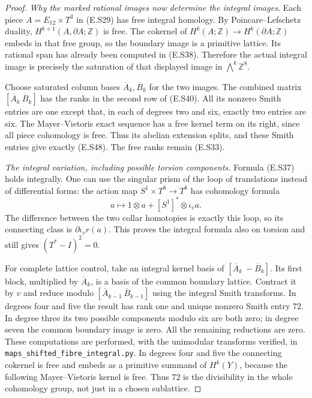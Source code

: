 \begin{proof}
\emph{Why the marked rational images now determine the integral images.}
Each piece $A=E_{12}\times T^3$ in (E.S29) has free
integral homology. By Poincare--Lefschetz duality,
$H^{k+1}(A,\partial A;\mathbb Z)$ is free. The cokernel
of $H^k(A;\mathbb Z)\to H^k(\partial A;\mathbb Z)$
embeds in that free group, so the boundary image is a
primitive lattice. Its rational span has already been
computed in (E.S38). Therefore the actual integral
image is precisely the saturation of that displayed
image in $\bigwedge^k\mathbb Z^8$.

Choose saturated column bases $\overline A_k,\overline B_k$
for the two images. The combined matrix
$[\overline A_k\ \overline B_k]$ has the ranks in the
second row of (E.S40). All its nonzero Smith entries are
one except that, in each of degrees two and six, exactly
two entries are six. The Mayer--Vietoris exact sequence
has a free kernel term on its right, since all piece
cohomology is free. Thus its abelian extension splits,
and these Smith entries give exactly (E.S48). The free
ranks remain (E.S33).

\emph{The integral variation, including possible torsion components.}
Formula (E.S37) holds integrally. One can use the singular
prism of the loop of translations instead of differential
forms: the action map $S^1\times T^8\to T^8$ has
cohomology formula
\[
 a\longmapsto 1\otimes a+[S^1]^*\otimes\iota_v a.
\]
The difference between the two collar homotopies is
exactly this loop, so its connecting class is
$\partial\iota_v r(a)$. This proves the integral formula
also on torsion and still gives $(T^*-I)^2=0$.

For complete lattice control, take an integral kernel
basis of $[\overline A_k\ -\overline B_k]$. Its first
block, multiplied by $\overline A_k$, is a basis of the
common boundary lattice. Contract it by $v$ and reduce
modulo $[\overline A_{k-1}\ \overline B_{k-1}]$ using
the integral Smith transforms. In degrees four and five
the result has rank one and unique nonzero Smith entry
$72$. In degree three its two possible components
modulo six are both zero; in degree seven the common
boundary image is zero. All the remaining reductions
are zero. These computations are performed, with the
unimodular transforms verified, in
\texttt{maps\_shifted\_fibre\_integral.py}.
In degrees four and five the connecting cokernel is
free and embeds as a primitive summand of $H^k(Y)$,
because the following Mayer--Vietoris kernel is free.
Thus $72$ is the divisibility in the whole cohomology
group, not just in a chosen sublattice.


\end{proof}
